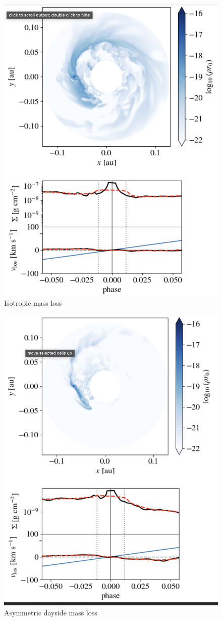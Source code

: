 \documentclass[twocolumn]{aastex631}
\begin{document}
\begin{figure}
    \includegraphics[width=0.8\linewidth]{figures/homogeneous.png}
    \caption{Isotropic mass loss}
    \label{fig:IsotropicMdot}
\end{figure}

\begin{figure}
    \includegraphics[width=0.8\linewidth]{figures/asym.png}
    \caption{Asymmetric dayside mass loss}
    \label{fig:DaysideMdot}
\end{figure}
\end{document}
